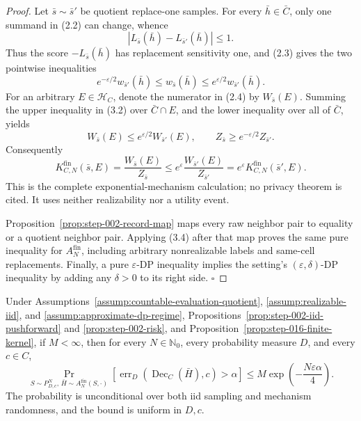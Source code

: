\begin{proof}
Let \(\bar s\sim\bar s'\) be quotient replace-one samples. For
every \(\bar h\in\bar C\), only one summand in (2.2) can change, whence
\[
|L_{\bar s}(\bar h)-L_{\bar s'}(\bar h)|\le1.
\tag{3.1}
\]
Thus the score \(-L_{\bar s}(\bar h)\) has replacement sensitivity one, and
(2.3) gives the two pointwise inequalities
\[
e^{-\varepsilon/2}w_{\bar s'}(\bar h)
\le w_{\bar s}(\bar h)
\le e^{\varepsilon/2}w_{\bar s'}(\bar h).
\tag{3.2}
\]
For an arbitrary \(E\in\mathcal H_C\), denote the numerator in (2.4) by
\(W_{\bar s}(E)\). Summing the upper inequality in (3.2) over
\(\bar C\cap E\), and the lower inequality over all of \(\bar C\), yields
\[
W_{\bar s}(E)\le e^{\varepsilon/2}W_{\bar s'}(E),
\qquad
Z_{\bar s}\ge e^{-\varepsilon/2}Z_{\bar s'}.
\tag{3.3}
\]
Consequently
\[
K^{\mathrm{fin}}_{C,N}(\bar s,E)
=\frac{W_{\bar s}(E)}{Z_{\bar s}}
\le e^\varepsilon
\frac{W_{\bar s'}(E)}{Z_{\bar s'}}
=e^\varepsilon K^{\mathrm{fin}}_{C,N}(\bar s',E).
\tag{3.4}
\]
This is the complete exponential-mechanism calculation; no privacy theorem
is cited. It uses neither realizability nor a utility event.

Proposition~\ref{prop:step-002-record-map} maps every raw neighbor
pair to equality or a quotient neighbor pair. Applying (3.4) after that map
proves the same pure inequality for \(A_N^{\mathrm{fin}}\), including
arbitrary nonrealizable labels and same-cell replacements. Finally, a pure
\(\varepsilon\)-DP inequality implies the setting's
\((\varepsilon,\delta)\)-DP inequality by adding any \(\delta>0\) to its
right side. \(\square\)


\end{proof}

\begin{lemma}\label{lem:step-016-finite-tail}
Under Assumptions~\ref{assump:countable-evaluation-quotient},
\ref{assump:realizable-iid}, and
\ref{assump:approximate-dp-regime}, 
Propositions~\ref{prop:step-002-iid-pushforward} and
\ref{prop:step-002-risk}, and
Proposition~\ref{prop:step-016-finite-kernel}, if \(M<\infty\), then for
every \(N\in\mathbb N_0\), every probability measure \(D\), and every
\(c\in C\),
\[
\Pr_{S\sim P_{D,c}^N,\,
\bar H\sim A_N^{\mathrm{fin}}(S,\cdot)}
\!\left[
\operatorname{err}_D(\operatorname{Dec}_C(\bar H),c)>\alpha
\right]
\le M\exp\!\left(-\frac{N\varepsilon\alpha}{4}\right).
\tag{4.1}
\]
The probability is unconditional over both iid sampling and mechanism
randomness, and the bound is uniform in \(D,c\).


\end{lemma}

